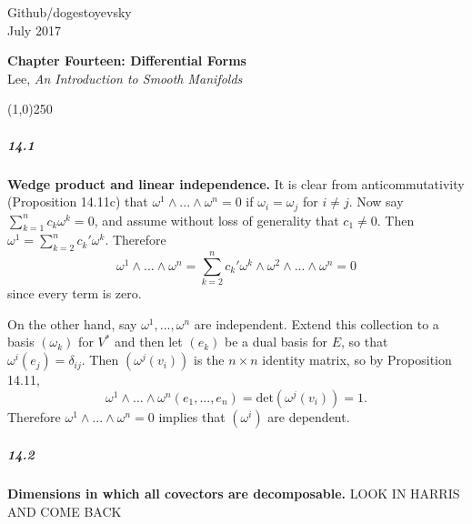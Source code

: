 \documentclass[10pt,letter]{article}
\begin{document}
\noindent Github/dogestoyevsky \\
July 2017
\begin{center}
\textbf{Chapter Fourteen: Differential Forms}\\ Lee, \textit{An Introduction to Smooth Manifolds}

\line(1,0){250}
\end{center}
\subparagraph*{14.1} {\bf Wedge product and linear independence.} It is clear from anticommutativity (Proposition 14.11c) that $\omega^1 \wedge ... \wedge \omega^n = 0$ if $\omega_i = \omega_j$ for $i \neq j$. Now say $\sum_{k=1}^n c_k \omega^k = 0$, and assume without loss of generality that $c_1 \neq 0$. Then $\omega^1 = \sum_{k=2}^n c_k' \omega^k$. Therefore 
\[ \omega^1 \wedge ... \wedge \omega^n = \sum_{k=2}^n c_k' \omega^k \wedge \omega^2  \wedge ... \wedge \omega^n = 0 \] since every term is zero. 

On the other hand, say $\omega^1,...,\omega^n$ are independent. Extend this collection to a basis $(\omega_k)$ for $V^{\ast}$ and then let $(e_k)$ be a dual basis for $E$, so that $\omega^i(e_j) = \delta_{ij}$. Then $(\omega^j(v_i))$ is the $n \times n$ identity matrix, so by Proposition 14.11, \[ \omega^1 \wedge ... \wedge \omega^n(e_1,...,e_n) = \text{det}(\omega^j(v_i)) = 1. \] Therefore $\omega^1 \wedge ... \wedge \omega^n = 0$ implies that $(\omega^i)$ are dependent. 

\subparagraph*{14.2} {\bf Dimensions in which all covectors are decomposable.}  LOOK IN HARRIS AND COME BACK
\end{document}

